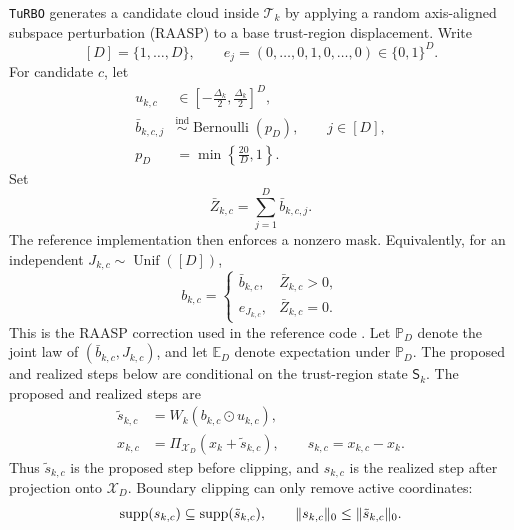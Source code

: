 \documentclass[10pt]{article}
\numberwithin{equation}{section}
\newcommand{\TuRBO}{\textnormal{\texttt{TuRBO}}}
\newcommand{\X}{\mathcal{X}}
\newcommand{\OmegaD}{\X_D}
\newcommand{\TR}{\mathcal{T}}
\DeclareMathOperator{\supp}{supp}
\DeclareMathOperator{\Bern}{Bernoulli}
\DeclareMathOperator{\Unif}{Unif}
\DeclarePairedDelimiter{\norm}{\lVert}{\rVert}
\theoremstyle{plain}
\theoremstyle{definition}
\theoremstyle{remark}
\begin{document}
\TuRBO{} generates a candidate cloud inside \(\TR_k\) by applying a random
axis-aligned subspace perturbation (RAASP) to a base trust-region displacement.
Write
\[
  [D]=\{1,\ldots,D\},
  \qquad
  e_j=(0,\ldots,0,1,0,\ldots,0)\in\{0,1\}^{D}.
\]
For candidate \(c\), let
\begin{align}
  u_{k,c}
  &\in
  \left[-\frac{\Delta_k}{2},\frac{\Delta_k}{2}\right]^D,
  \label{eq:base-displacement}
  \\
  \bar b_{k,c,j}
  &\stackrel{\mathrm{ind}}{\sim}\Bern(p_D),
  \qquad j\in[D],
  \label{eq:raw-mask}
  \\
  p_D
  &=
  \min\left\{\frac{20}{D},1\right\}.
  \label{eq:mask-prob}
\end{align}
Set
\begin{equation}
  \bar Z_{k,c}=\sum_{j=1}^{D}\bar b_{k,c,j}.
  \label{eq:raw-mask-size}
\end{equation}
The reference implementation then enforces a nonzero mask.  Equivalently, for
an independent \(J_{k,c}\sim\Unif([D])\),
\begin{equation}
  b_{k,c}
  =
  \begin{cases}
    \bar b_{k,c}, & \bar Z_{k,c}>0,\\
    e_{J_{k,c}}, & \bar Z_{k,c}=0.
  \end{cases}
  \label{eq:corrected-mask}
\end{equation}
This is the RAASP correction used in the reference code \cite{turboOne}.
Let \(\mathbb{P}_D\) denote the joint law of \((\bar b_{k,c},J_{k,c})\), and let
\(\mathbb{E}_D\) denote expectation under \(\mathbb{P}_D\).  The proposed and realized steps
below are conditional on the trust-region state \(\mathsf S_k\).
The proposed and realized steps are
\begin{align}
  \tilde s_{k,c}
  &=
  W_k(b_{k,c}\odot u_{k,c}),
  \label{eq:proposed-step}
  \\
  x_{k,c}
  &=
  \Pi_{\OmegaD}(x_k+\tilde s_{k,c}),
  \qquad
  s_{k,c}=x_{k,c}-x_k .
  \label{eq:realized-step}
\end{align}
Thus \(\tilde s_{k,c}\) is the proposed step before clipping, and
\(s_{k,c}\) is the realized step after projection onto \(\OmegaD\).  Boundary
clipping can only remove active coordinates:
\begin{equation}
  \supp(s_{k,c})\subseteq\supp(\tilde s_{k,c}),
  \qquad
  \norm{s_{k,c}}_0\le\norm{\tilde s_{k,c}}_0 .
  \label{eq:clipping-support}
\end{equation}
\end{document}

